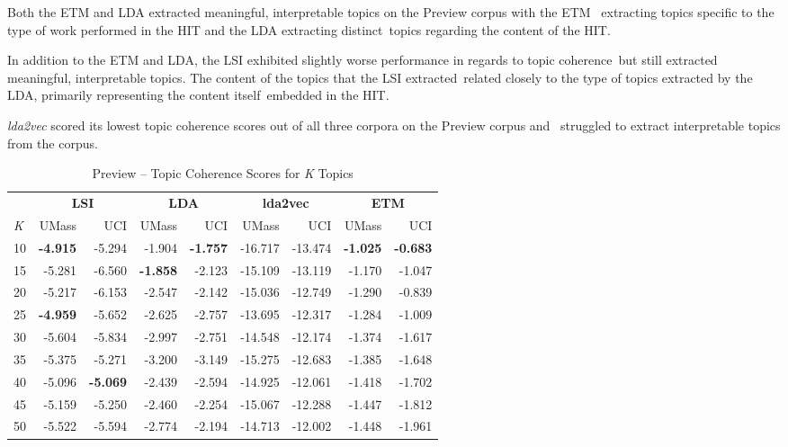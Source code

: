 \documentclass[letterpaper,12pt]{article}
\begin{document}
Both the ETM and LDA extracted meaningful, interpretable topics on the Preview corpus with the ETM \
extracting topics specific to the type of work performed in the HIT and the LDA extracting distinct\
topics regarding the content of the HIT.

In addition to the ETM and LDA, the LSI exhibited slightly worse performance in regards to topic coherence\
but still extracted meaningful, interpretable topics. The content of the topics that the LSI extracted\
related closely to the type of topics extracted by the LDA, primarily representing the content itself\
embedded in the HIT.

\emph{lda2vec} scored its lowest topic coherence scores out of all three corpora on the Preview corpus and \
struggled to extract interpretable topics from the corpus.
\begin{table}
	\caption{\label{tab:preview_tc} Preview -- Topic Coherence Scores for \emph{K} Topics}
	\begin{center}
		\begin{tabular}{| l |rr|rr|rr|rr|}
			\hline
			{} & \multicolumn{2}{c|}{\textbf{LSI}} & \multicolumn{2}{c|}{\textbf{LDA}} & \multicolumn{2}{c|}{\textbf{lda2vec}} & \multicolumn{2}{c|}{\textbf{ETM}} \\
			\emph{K} &  UMass &    UCI &  UMass &    UCI &   UMass &     UCI &  UMass &    UCI \\
			\hline
			10  & \textbf{-4.915} & -5.294 & -1.904 & \textbf{-1.757} & -16.717 & -13.474 & \textbf{-1.025} & \textbf{-0.683} \\
			15  & -5.281 & -6.560 & \textbf{-1.858} & -2.123 & -15.109 & -13.119 & -1.170 & -1.047 \\
			20  & -5.217 & -6.153 & -2.547 & -2.142 & -15.036 & -12.749 & -1.290 & -0.839 \\
			25  & \textbf{-4.959} & -5.652 & -2.625 & -2.757 & -13.695 & -12.317 & -1.284 & -1.009 \\
			30  & -5.604 & -5.834 & -2.997 & -2.751 & -14.548 & -12.174 & -1.374 & -1.617 \\
			35  & -5.375 & -5.271 & -3.200 & -3.149 & -15.275 & -12.683 & -1.385 & -1.648 \\
			40  & -5.096 & \textbf{-5.069} & -2.439 & -2.594 & -14.925 & -12.061 & -1.418 & -1.702 \\
			45  & -5.159 & -5.250 & -2.460 & -2.254 & -15.067 & -12.288 & -1.447 & -1.812 \\
			50  & -5.522 & -5.594 & -2.774 & -2.194 & -14.713 & -12.002 & -1.448 & -1.961 \\

\end{tabular}
\end{center}
\end{table}
\end{document}

